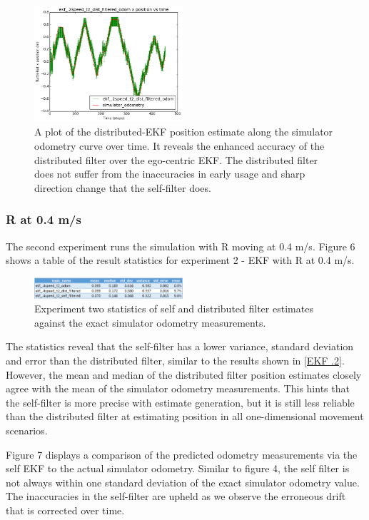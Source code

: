 \documentclass[conference]{IEEEtran} \usepackage[T1]{fontenc} \usepackage[backend=biber, style=ieee]{biblatex}
\begin{document}
\begin{figure}
\centering 
\includegraphics[width=0.49\textwidth]{ekf_2speed_t2_dist_filtered_odom_pos_err_graph}
\caption {A plot of the distributed-EKF position estimate along the simulator odometry curve over time. It 
reveals the enhanced accuracy of the distributed filter over the ego-centric EKF. The distributed filter does not suffer 
from the inaccuracies in early usage and sharp direction change that the self-filter does.}
\label{pic5}
\end{figure}

\subsubsection{R at 0.4 m/s} \label{EKF .4}
The second experiment runs the simulation with R moving at 0.4 m/s. Figure 6 shows a table of the result statistics for 
experiment 2 - EKF with R at 0.4 m/s. 

\begin{figure}[!ht]
\label{pic6} 
\centering 
\includegraphics[width=0.49\textwidth]{ekf_4_table}
\caption{Experiment two statistics of self and distributed filter estimates against the exact simulator odometry measurements.} 
\end{figure}

The statistics reveal that the self-filter has a lower variance, standard deviation and error than the distributed 
filter, similar to the results shown in \ref{EKF .2}. However, the mean and median of the distributed filter position estimates closely agree with 
the mean of the simulator odometry measurements. This hints that the self-filter is more precise with estimate generation, but it is 
still less reliable than the distributed filter at estimating position in all one-dimensional movement scenarios.

Figure 7 displays a comparison of the predicted odometry measurements via the self EKF to the actual simulator 
odometry. Similar to figure 4, the self filter is not always within one standard deviation of the exact simulator 
odometry value. The inaccuracies in the self-filter are upheld as we observe the erroneous drift that is corrected over time.
\end{document}
